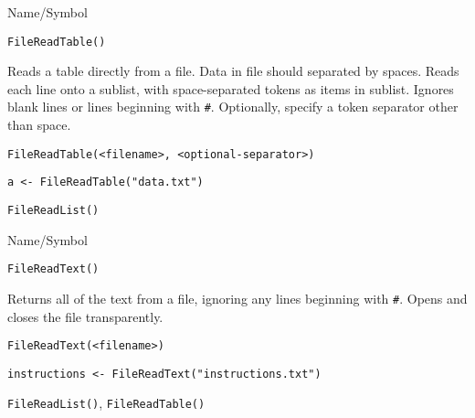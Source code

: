 \begin{desc}{Name/Symbol}
\item[Name/Symbol]	\verb+FileReadTable()+

\item[Description]	Reads a table directly from a file. Data in file should
		separated by spaces.  Reads each line onto a sublist,
		with space-separated tokens as items in sublist.  Ignores
		blank lines or lines beginning with \verb+#+. Optionally,
		specify a token separator other than space.

\item[Usage]
\begin{verbatim}
FileReadTable(<filename>, <optional-separator>)
\end{verbatim}

\item[Example]
\begin{verbatim}
a <- FileReadTable("data.txt")
\end{verbatim}

\item[See Also]	\verb+FileReadList()+
\end{desc}

\rl




\begin{desc}{Name/Symbol}
\item[Name/Symbol]	\verb+FileReadText()+

\item[Description]	Returns all of the text from a file, ignoring any lines
		beginning with \verb+#+. Opens and closes the file transparently.

\item[Usage]
\begin{verbatim}
FileReadText(<filename>)
\end{verbatim}

\item[Example]
\begin{verbatim}
instructions <- FileReadText("instructions.txt")
\end{verbatim}

\item[See Also]	\verb+FileReadList()+, \verb+FileReadTable()+
\end{desc}

\rl




